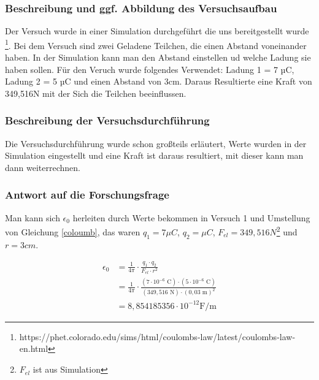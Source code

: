 \documentclass{report}
\begin{document}
\subsubsection{Beschreibung und ggf. Abbildung des Versuchsaufbau} %
\label{ssub:Beschreibung und ggf. Abbildung des Versuchsaufbau}
Der Versuch wurde in einer Simulation durchgeführt die uns bereitgestellt
wurde \footnote{https://phet.colorado.edu/sims/html/coulombs-law/latest/coulombs-law-en.html}.
Bei dem Versuch sind zwei Geladene Teilchen, die einen Abstand voneinander
haben. In der Simulation kann man den Abstand einstellen ud welche Ladung sie haben sollen.
Für den Veruch wurde folgendes Verwendet: Ladung 1 = 7 µC, Ladung 2 = 5 µC und einen Abstand von 3cm.
Daraus Resultierte eine Kraft von 349,516N mit der Sich die Teilchen beeinflussen.





\subsubsection{Beschreibung der Versuchsdurchführung} %
\label{ssub:Beschreibung der Versuchsdurchführung}
Die Versuchsdurchführung wurde schon großteils erläutert, Werte wurden in der
Simulation eingestellt und eine Kraft ist daraus resultiert, mit dieser kann
man dann weiterrechnen.


\subsubsection{Antwort auf die Forschungsfrage} %
\label{ssub:Messergebnisse und ggf. grafische Veranschaulichung}
Man kann sich $\epsilon_0$ herleiten durch Werte bekommen in Versuch 1 und
Umstellung von Gleichung \ref{coloumb}, das
waren $q_1=7\mu C$, $q_2=\mu C$, $F_{el}=349,516N$\footnote{$F_{el}$ ist aus Simulation} und $r=3cm$.

\begin{align}
\epsilon_0 &= \frac{1}{4\pi} \cdot \frac{q_1 \cdot q_2}{F_{el} \cdot r^2} \\
&= \frac{1}{4\pi} \cdot \frac{(7\cdot 10^{-6}\text{ C}) \cdot (5\cdot
10^{-6}\text{ C})}{(349,516\text{ N}) \cdot (0,03\text{ m})^2} \\
&= 8,854185356\cdot 10^{-12}\text{F/m} \label{eps-rech-2}
\end{align}
\end{document}
